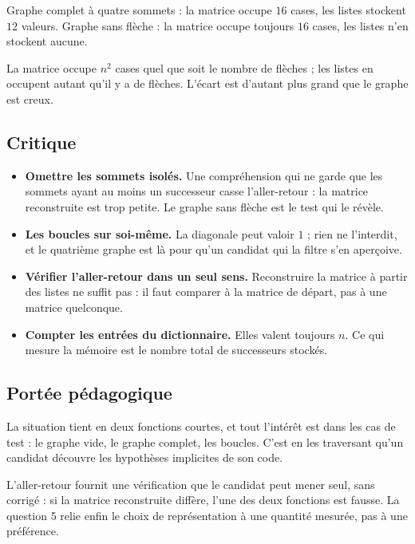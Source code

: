 Graphe complet à quatre sommets : la matrice occupe $16$ cases, les listes
stockent $12$ valeurs. Graphe sans flèche : la matrice occupe toujours $16$
cases, les listes n'en stockent aucune.

La matrice occupe $n^2$ cases quel que soit le nombre de flèches ; les listes en
occupent autant qu'il y a de flèches. L'écart est d'autant plus grand que le
graphe est creux.

\subsection*{Critique}

\begin{itemize}
  \item \textbf{Omettre les sommets isolés.} Une compréhension qui ne garde que
    les sommets ayant au moins un successeur casse l'aller-retour : la matrice
    reconstruite est trop petite. Le graphe sans flèche est le test qui le
    révèle.
  \item \textbf{Les boucles sur soi-même.} La diagonale peut valoir $1$ ; rien
    ne l'interdit, et le quatrième graphe est là pour qu'un candidat qui la
    filtre s'en aperçoive.
  \item \textbf{Vérifier l'aller-retour dans un seul sens.} Reconstruire la
    matrice à partir des listes ne suffit pas : il faut comparer à la matrice
    de départ, pas à une matrice quelconque.
  \item \textbf{Compter les entrées du dictionnaire.} Elles valent toujours $n$.
    Ce qui mesure la mémoire est le nombre total de successeurs stockés.
\end{itemize}

\subsection*{Portée pédagogique}

La situation tient en deux fonctions courtes, et tout l'intérêt est dans les
cas de test : le graphe vide, le graphe complet, les boucles. C'est en les
traversant qu'un candidat découvre les hypothèses implicites de son code.

L'aller-retour fournit une vérification que le candidat peut mener seul, sans
corrigé : si la matrice reconstruite diffère, l'une des deux fonctions est
fausse. La question 5 relie enfin le choix de représentation à une quantité
mesurée, pas à une préférence.
